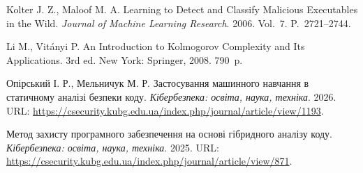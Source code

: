  Kolter J. Z., Maloof M. A. Learning to Detect and Classify Malicious Executables in the Wild. \emph{Journal of Machine Learning Research}. 2006. Vol.~7. P.~2721--2744.

 Li M., Vitányi P. An Introduction to Kolmogorov Complexity and Its Applications. 3rd ed. New York: Springer, 2008. 790~p.

 Опірський І. Р., Мельничук М. Р. Застосування машинного навчання в статичному аналізі безпеки коду. \emph{Кібербезпека: освіта, наука, техніка}. 2026. URL: \url{https://csecurity.kubg.edu.ua/index.php/journal/article/view/1193}.

 Метод захисту програмного забезпечення на основі гібридного аналізу коду. \emph{Кібербезпека: освіта, наука, техніка}. 2025. URL: \url{https://csecurity.kubg.edu.ua/index.php/journal/article/view/871}.
